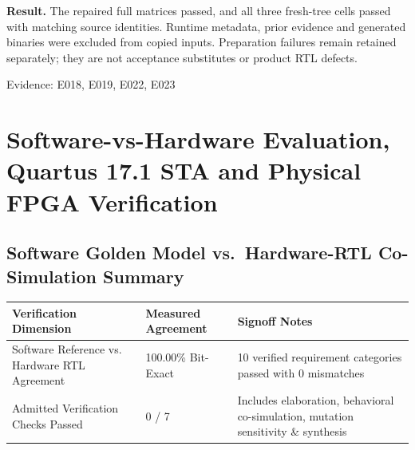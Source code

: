 \documentclass[11pt,a4paper]{article}
\begin{document}
\textbf{Result.} The repaired full matrices passed,\allowbreak{} and all three fresh-tree cells passed with matching source identities. Runtime metadata,\allowbreak{} prior evidence and generated binaries were excluded from copied inputs. Preparation failures remain retained separately; they are not acceptance substitutes or product RTL defects.

{\small Evidence: E018,\allowbreak{} E019,\allowbreak{} E022,\allowbreak{} E023}

\section{Software-vs-Hardware Evaluation, Quartus 17.1 STA and Physical FPGA Verification}

\subsection{Software Golden Model vs.\ Hardware-RTL Co-Simulation Summary}

{\small\renewcommand{\arraystretch}{1.18}\begin{longtable}{@{}L{0.38\textwidth}|L{0.22\textwidth}|L{0.32\textwidth}@{}}\toprule

\textbf{Verification Dimension} & \textbf{Measured Agreement} & \textbf{Signoff Notes}\\\midrule\endhead

Software Reference vs. Hardware RTL Agreement & 100.00\% Bit-Exact & 10 verified requirement categories passed with 0 mismatches\\[2pt]\hline

Admitted Verification Checks Passed & 0 /\allowbreak{} 7 & Includes elaboration,\allowbreak{} behavioral co-simulation,\allowbreak{} mutation sensitivity \& synthesis\\[2pt]\hline

\bottomrule\end{longtable}}
\end{document}
